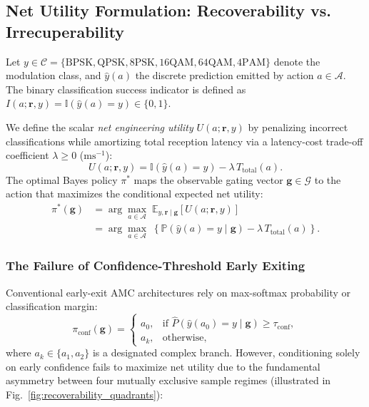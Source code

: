 \subsection{Net Utility Formulation: Recoverability vs. Irrecuperability}
\label{subsec:net_utility}

Let $y \in \mathcal{C} = \{\mathrm{BPSK}, \mathrm{QPSK}, \mathrm{8PSK}, \allowbreak \mathrm{16QAM}, \mathrm{64QAM}, \mathrm{4PAM}\}$ denote the modulation class, and $\hat{y}(a)$ the discrete prediction emitted by action $a \in \mathcal{A}$. The binary classification success indicator is defined as $I(a; \mathbf{r}, y) = \mathbb{I}(\hat{y}(a) = y) \in \{0, 1\}$.

We define the scalar \emph{net engineering utility} $U(a; \mathbf{r}, y)$ by penalizing incorrect classifications while amortizing total reception latency via a latency-cost trade-off coefficient $\lambda \ge 0$ ($\mathrm{ms}^{-1}$):
\begin{equation}
    U(a; \mathbf{r}, y) = \mathbb{I}(\hat{y}(a) = y) - \lambda \, T_{\mathrm{total}}(a).
    \label{eq:net_utility_def}
\end{equation}
The optimal Bayes policy $\pi^*$ maps the observable gating vector $\mathbf{g} \in \mathcal{G}$ to the action that maximizes the conditional expected net utility:
\begin{align}
    \pi^*(\mathbf{g}) &= \arg\max_{a \in \mathcal{A}} \; \mathbb{E}_{y, \mathbf{r} \mid \mathbf{g}} \left[ U(a; \mathbf{r}, y) \right] \nonumber \\
    &= \arg\max_{a \in \mathcal{A}} \; \left\{ \mathbb{P}(\hat{y}(a) = y \mid \mathbf{g}) - \lambda \, T_{\mathrm{total}}(a) \right\}.
    \label{eq:bayes_optimal_policy}
\end{align}

\subsubsection{The Failure of Confidence-Threshold Early Exiting}
Conventional early-exit AMC architectures \cite{liu2026beacon, liu2025joint} rely on max-softmax probability or classification margin:
\begin{equation}
    \pi_{\mathrm{conf}}(\mathbf{g}) = \begin{cases} a_0, & \text{if } \hat{P}(\hat{y}(a_0) = y \mid \mathbf{g}) \ge \tau_{\mathrm{conf}}, \\ a_k, & \text{otherwise}, \end{cases}
    \label{eq:conf_policy}
\end{equation}
where $a_k \in \{a_1, a_2\}$ is a designated complex branch. However, conditioning solely on early confidence fails to maximize net utility due to the fundamental asymmetry between four mutually exclusive sample regimes (illustrated in Fig.~\ref{fig:recoverability_quadrants}):

